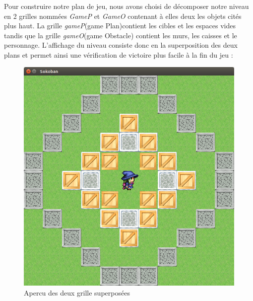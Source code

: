 \documentclass{article}
\begin{document}
			
Pour construire notre plan de jeu, nous avons choisi de décomposer notre niveau en 2 grilles nommées \textit{GameP} et \textit{GameO} contenant à elles deux les objets cités plus haut. La grille \textit{gameP}(game Plan)contient les cibles et les espaces vides tandis que la grille \textit{gameO}(game Obstacle) contient les murs, les caisses et le personnage. L'affichage du niveau consiste donc en la superposition des deux plans et permet ainsi une vérification de victoire plus facile à la fin du jeu : 
\begin{figure}[!h]
\centering
\includegraphics[scale=0.25]{img/05.png}
\caption{Apercu des deux grille superposées}
\end{figure}
\end{document}
